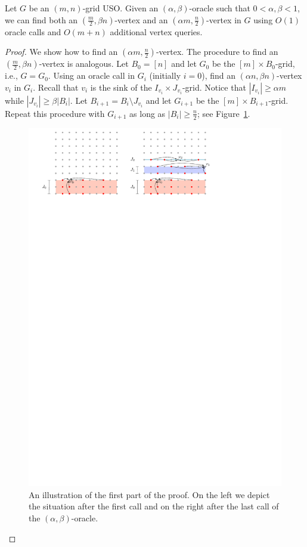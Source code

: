 \documentclass[runningheads,a4paper]{llncs}
\begin{document}
\begin{lemma}\label{lemma:Climbing lemma}
Let $G$ be an $(m,n)$-grid USO.
Given an $(\alpha, \beta)$-oracle such that $0 < \alpha, \beta  < 1$, we can find both an $(\frac{m}{2}, \beta n)$-vertex and an $(\alpha m, \frac{n}{2})$-vertex in $G$ using $O(1)$ oracle calls and $O(m+n)$ additional vertex queries.
\end{lemma}
\begin{proof}
We show how to find an $(\alpha m,  \frac{n}{2})$-vertex. The procedure to find an $( \frac{m}{2}, \beta n)$-vertex is analogous.
Let $B_0 = [n]$ and let $G_0$ be the $[m]\times B_0$-grid, i.e., $G = G_0$.
Using an oracle call in $G_i$ (initially $i = 0$), find an $(\alpha n, \beta n)$-vertex $v_i$ in $G_i$. 
Recall that $v_i$ is the sink of the $I_{v_i}\times J_{v_i}$-grid. %
Notice that $|I_{v_i}| \geq \alpha m$ while $|J_{v_i}| \geq \beta |B_i|$.
Let $B_{i+1} = B_i\setminus J_{v_i}$ and let $G_{i+1}$ be the $[m]\times B_{i+1}$-grid. 
Repeat this procedure with $G_{i+1}$ as long as $|B_i| \geq  \frac{n}{2}$; see Figure~\ref{fig:Climbing Lemma}.

\begin{figure}[h]
\centering
\includegraphics[width=1\textwidth]{ClimbingLemma.pdf}
\caption{\small An illustration of the first part of the proof. On the left we depict the situation after the first call and on the right after the last call of the $(\alpha, \beta)$-oracle.}
\label{fig:Climbing Lemma}
\end{figure}


\end{proof}
\end{document}

